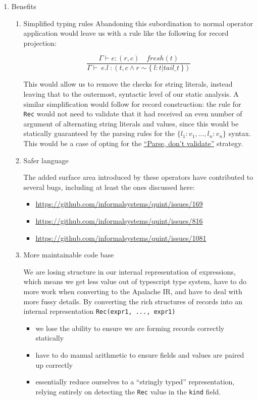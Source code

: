 \documentclass[11pt]{article}
\begin{document}
\begin{enumerate}
\item Benefits
\label{sec:org36441ad}

\begin{enumerate}
\item Simplified typing rules
\label{sec:org0e97219}
Abandoning this subordination to normal operator application would leave
us with a rule like the following for record projection:

$$
\frac
{ \Gamma \vdash e \colon (r, c) \quad fresh(t) }
{ \Gamma \vdash \ e.l \ \colon (t, c \land r \sim \{ \ l \colon t | tail\_t \ \}) }
$$

This would allow us to remove the checks for string literals, instead leaving that
to the outermost, syntactic level of our static analysis. A similar
simplification would follow for record construction: the rule for \texttt{Rec} would
not need to validate that it had received an even number of argument of
alternating string literals and values, since this would be statically
guaranteed by the parsing rules for the \(\{ l_1 : v_1, \ldots, l_n : v_n \}\)
syntax. This would be a case of opting for the \href{https://lexi-lambda.github.io/blog/2019/11/05/parse-don-t-validate/}{``Parse, don't validate''} strategy.

\item Safer language
\label{sec:org53a2258}

The added surface area introduced by these operators have contributed to several
bugs, including at least the ones discussed here:

\begin{itemize}
\item \url{https://github.com/informalsystems/quint/issues/169}
\item \url{https://github.com/informalsystems/quint/issues/816}
\item \url{https://github.com/informalsystems/quint/issues/1081}
\end{itemize}

\item More maintainable code base
\label{sec:org03c9b45}

We are losing structure in our internal representation of expressions, which
means we get less value out of typescript type system, have to do more work
when converting to the Apalache IR, and have to deal with more fussy details. By
converting the rich structures of records into an internal representation
\texttt{Rec(expr1, ..., expr1)}

\begin{itemize}
\item we lose the ability to ensure we are forming records correctly statically
\item have to do manual arithmetic to ensure fields and values are paired up
correctly
\item essentially reduce ourselves to a ``stringly typed'' representation, relying
entirely on detecting the \texttt{Rec} value in the \texttt{kind} field.
\end{itemize}
\end{enumerate}
\end{enumerate}
\end{document}
